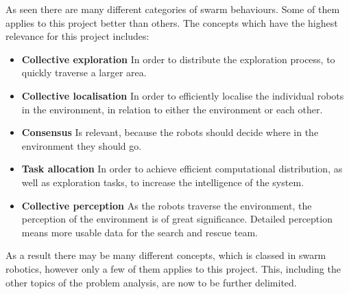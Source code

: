 As seen there are many different categories of swarm behaviours. Some of them applies to this project better than others. The concepts which have the highest relevance for this project includes:
\begin{itemize}
    \item \textbf{Collective exploration}
    In order to distribute the exploration process, to quickly traverse a larger area.
    \item \textbf{Collective localisation}
    In order to efficiently localise the individual robots in the environment, in relation to either the environment or each other. 
    \item \textbf{Consensus}
    Is relevant, because the robots should decide where in the environment they should go.
    \item \textbf{Task allocation}
    In order to achieve efficient computational distribution, as well as exploration tasks, to increase the intelligence of the system.
    \item \textbf{Collective perception}
    As the robots traverse the environment, the perception of the environment is of great significance. Detailed perception means more usable data for the search and rescue team.
\end{itemize}

As a result there may be many different concepts, which is classed in swarm robotics, however only a few of them applies to this project. This, including the other topics of the problem analysis, are now to be further delimited.